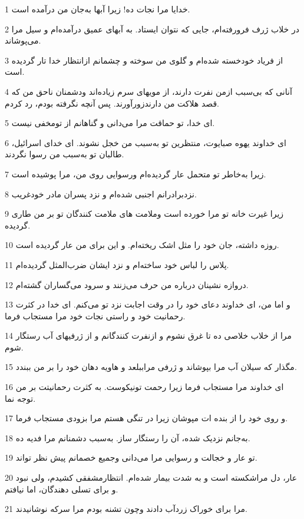 \par 1 خدایا مرا نجات ده! زیرا آبها به‌جان من درآمده است.
\par 2 در خلاب ژرف فرورفته‌ام، جایی که نتوان ایستاد. به آبهای عمیق درآمده‌ام و سیل مرا می‌پوشاند.
\par 3 از فریاد خودخسته شده‌ام و گلوی من سوخته و چشمانم ازانتظار خدا تار گردیده است.
\par 4 آنانی که بی‌سبب ازمن نفرت دارند، از مویهای سرم زیاده‌اند ودشمنان ناحق من که قصد هلاکت من دارندزورآورند. پس آنچه نگرفته بودم، رد کردم.
\par 5 ‌ای خدا، تو حماقت مرا می‌دانی و گناهانم از تومخفی نیست.
\par 6 ‌ای خداوند یهوه صبایوت، منتظرین تو به‌سبب من خجل نشوند. ای خدای اسرائیل، طالبان تو به‌سبب من رسوا نگردند.
\par 7 زیرا به‌خاطر تو متحمل عار گردیده‌ام ورسوایی روی من، مرا پوشیده است.
\par 8 نزدبرادرانم اجنبی شده‌ام و نزد پسران مادر خودغریب.
\par 9 زیرا غیرت خانه تو مرا خورده است وملامت های ملامت کنندگان تو بر من طاری گردیده.
\par 10 روزه داشته، جان خود را مثل اشک ریخته‌ام. و این برای من عار گردیده است.
\par 11 پلاس را لباس خود ساخته‌ام و نزد ایشان ضرب‌المثل گردیده‌ام.
\par 12 دروازه نشینان درباره من حرف می‌زنند و سرود می‌گساران گشته‌ام.
\par 13 و اما من، ای خداوند دعای خود را در وقت اجابت نزد تو می‌کنم. ای خدا در کثرت رحمانیت خود و راستی نجات خود مرا مستجاب فرما.
\par 14 مرا از خلاب خلاصی ده تا غرق نشوم و ازنفرت کنندگانم و از ژرفیهای آب رستگار شوم.
\par 15 مگذار که سیلان آب مرا بپوشاند و ژرفی مراببلعد و هاویه دهان خود را بر من ببندد.
\par 16 ‌ای خداوند مرا مستجاب فرما زیرا رحمت تونیکوست. به کثرت رحمانیتت بر من توجه نما.
\par 17 و روی خود را از بنده ات مپوشان زیرا در تنگی هستم مرا بزودی مستجاب فرما.
\par 18 به‌جانم نزدیک شده، آن را رستگار ساز. به‌سبب دشمنانم مرا فدیه ده.
\par 19 تو عار و خجالت و رسوایی مرا می‌دانی وجمیع خصمانم پیش نظر تواند.
\par 20 عار، دل مراشکسته است و به شدت بیمار شده‌ام. انتظارمشفقی کشیدم، ولی نبود و برای تسلی دهندگان، اما نیافتم.
\par 21 مرا برای خوراک زردآب دادند وچون تشنه بودم مرا سرکه نوشانیدند.
